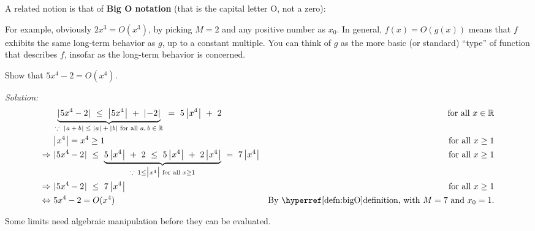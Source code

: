 \statecomment{\vspace{-1mm}\[
\lim_{x \to \infty} ~x^n ~=~ \begin{cases}
                            \infty & \text{for any real $n > 0$}\\
                            0 & \text{for any real $n < 0$}
                           \end{cases}
\qquad\quad
\lim_{x \to -\infty} ~x^n ~=~ \begin{cases}
                            \infty & \text{for } n = 2, 4, 6, 8, \ldots\\
                            -\infty & \text{for } n = 1, 3, 5, 7, \ldots
                           \end{cases}
\]
\[
\lim_{x \to \infty} ~e^x ~=~ \infty \qquad\quad
\lim_{x \to -\infty} ~e^x ~=~ 0 \qquad\quad
\lim_{x \to \infty} ~e^{-x} ~=~ 0 \qquad\quad
\lim_{x \to -\infty} ~e^{-x} ~=~ \infty
\]
\[
\lim_{x \to \infty} ~\ln\,x ~=~ \infty \qquad\qquad
\lim_{x \to 0+} ~\ln\,x ~=~ -\infty
\]}

A related notion is that of \textbf{Big O notation} (that is the capital letter
O, not a zero):


\noindent For example, obviously $2x^3 = O(x^3)$, by picking $M = 2$ and
any positive number as $x_0$. In general, $f(x) = O(g(x))$ means that $f$ exhibits the
same long-term behavior as $g$, up to a constant multiple. You can think of $g$
as the more basic (or standard) ``type'' of function that describes $f$, insofar as the long-term
behavior is concerned.

\begin{exmp}\label{exmp:bigOexmp}
  \noindent Show that $5x^4 - 2 = O(x^4)$.\vspace{1mm}
  \par\noindent\emph{Solution:}
  \begin{align*}
    &\underbrace{
      \abs{5x^4 - 2} ~\le~ \Abs{5x^4} ~+~ \abs{-2}
    }_\text{$\because~ \abs{a + b} \le \abs{a} + \abs{b}$ for all $a, b \in \Reals$}
    ~=~ 5\,\Abs{x^4} ~+~ 2 &\text{for all $x \in \Reals$}\\
    &\Abs{x^4} = x^4 \ge 1 &\text{for all $x \ge 1$}\\
    \Rightarrow~ &\abs{5x^4 - 2} ~\le~ \underbrace{
      5\,\Abs{x^4} ~+~ 2 ~\le~ 5\,\Abs{x^4} ~+~ 2\,\Abs{x^4}
    }_{\because~ 1 \le \Abs{x^4} \text{ for all } x \ge 1}
    ~=~ 7\,\Abs{x^4} &\text{for all $x \ge 1$}\\
    \Rightarrow~ &\abs{5x^4 - 2} ~\le~ 7\,\Abs{x^4} &\text{for all $x \ge 1$}\\
    \Leftrightarrow~ &5x^4 - 2 = O(x^4) &\text{By \CRef{defn:bigO}{definition}, with $M=7$ and $x_0=1$.}
  \end{align*}
\end{exmp}
\divider
\newpage
Some limits need algebraic manipulation before they can be evaluated.

